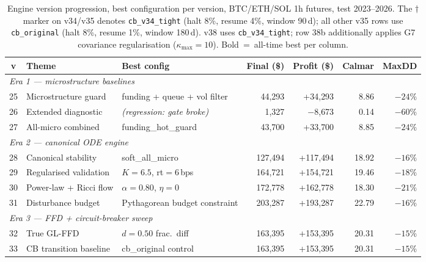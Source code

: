 \documentclass[11pt,oneside]{amsart}
\def\textbf#1{#1}%
\theoremstyle{plain}
\theoremstyle{definition}
\renewcommand{\arraystretch}{1.25}
\begin{document}
\begin{table}[htbp]
\caption{Engine version progression, best configuration per version,
  BTC/ETH/SOL 1h futures, test 2023--2026.
  The $\dagger$ marker on v34/v35 denotes \texttt{cb\_v34\_tight}
  (halt 8\%, resume 4\%, window 90\,d); all other v35 rows use
  \texttt{cb\_original} (halt 8\%, resume 1\%, window 180\,d).
  v38 uses \texttt{cb\_v34\_tight}; row 38b additionally applies
  G7 covariance regularisation ($\kappa_{\max}{=}10$).
  \textbf{Bold}~=~all-time best per column.}
\label{tab:era}
\centering
\small
\setlength{\tabcolsep}{4pt}
\renewcommand{\arraystretch}{1.20}
\begin{tabular}{c l l r r r r}
\hline
\textbf{v} & \textbf{Theme} & \textbf{Best config} &
  \textbf{Final (\$)} & \textbf{Profit (\$)} &
  \textbf{Calmar} & \textbf{MaxDD} \\
\hline
\multicolumn{7}{l}{\textit{Era 1 — microstructure baselines}} \\
25 & Microstructure guard   & funding + queue + vol filter     &  44{,}293 &  +34{,}293 &  8.86 & $-24\%$ \\
26 & Extended diagnostic    & \textit{(regression: gate broke)} &   1{,}327 &   $-$8{,}673 &  0.14 & $-60\%$ \\
27 & All-micro combined     & funding\_hot\_guard               &  43{,}700 &  +33{,}700 &  8.85 & $-24\%$ \\
\hline
\multicolumn{7}{l}{\textit{Era 2 — canonical ODE engine}} \\
28 & Canonical stability    & soft\_all\_micro                  & 127{,}494 & +117{,}494 & 18.92 & $-16\%$ \\
29 & Regularised validation & $K{=}6.5$, rt$=6$\,bps           & 164{,}721 & +154{,}721 & 19.46 & $-18\%$ \\
30 & Power-law + Ricci flow & $\alpha{=}0.80$, $\eta{=}0$       & 172{,}778 & +162{,}778 & 18.30 & $-21\%$ \\
31 & Disturbance budget     & Pythagorean budget constraint     & 203{,}287 & +193{,}287 & 22.79 & $-16\%$ \\
\hline
\multicolumn{7}{l}{\textit{Era 3 — FFD + circuit-breaker sweep}} \\
32 & True GL-FFD            & $d{=}0.50$ frac.\ diff           & 163{,}395 & +153{,}395 & 20.31 & $-15\%$ \\
33 & CB transition baseline & cb\_original control             & 163{,}395 & +153{,}395 & 20.31 & $-15\%$ \\

\end{tabular}
\end{table}
\end{document}
